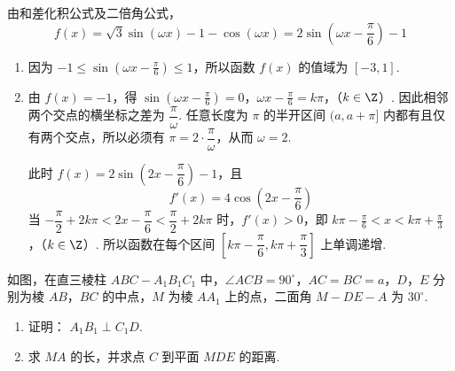 \begin{solution}
由和差化积公式及二倍角公式，
\[
f(x)=\sqrt{3}\sin(\omega x)-1-\cos(\omega x)=2\sin\left(\omega x-\frac{\pi}{6}\right)-1
\]

\begin{enumerate}
\item 因为 \(-1\leqslant\sin\left(\omega x-\frac{\pi}{6}\right)\leqslant1\)，所以函数 \(f(x)\) 的值域为 \([-3,1]\).
\item 由 \(f(x)=-1\)，得
\(\sin\left(\omega x-\frac{\pi}{6}\right)=0\)，\(\omega x-\frac{\pi}{6}=k\pi\)，（\(k\in\Z\)）.
因此相邻两个交点的横坐标之差为 \(\dfrac{\pi}{\omega}\). 任意长度为 \(\pi\) 的半开区间 \((a,a+\pi]\) 内都有且仅有两个交点，所以必须有 \(\pi=2\cdot\dfrac{\pi}{\omega}\)，从而 \(\omega=2\).

此时 \(f(x)=2\sin\left(2x-\dfrac{\pi}{6}\right)-1\)，且
\[
f'(x)=4\cos\left(2x-\frac{\pi}{6}\right)
\]
当 \(-\dfrac{\pi}{2}+2k\pi<2x-\dfrac{\pi}{6}<\dfrac{\pi}{2}+2k\pi\) 时，\(f'(x)>0\)，即
\(k\pi-\frac{\pi}{6}<x<k\pi+\frac{\pi}{3}\)，（\(k\in\Z\)）.
所以函数在每个区间 \(\left[k\pi-\dfrac{\pi}{6},k\pi+\dfrac{\pi}{3}\right]\) 上单调递增.
\end{enumerate}
\end{solution}

\begin{problem}
如图，在直三棱柱 \(ABC - A_{1}B_{1}C_{1}\) 中，\(\angle ACB = 90^{\circ}\)，\(AC = BC = a\)，\(D\)，\(E\) 分别为棱 \(AB\)，\(BC\) 的中点，\(M\) 为棱 \(AA_{1}\) 上的点，二面角 \(M - DE - A\) 为 \(30^{\circ}\).

\begin{enumerate}
\item 证明： \(A_{1}B_{1} \perp C_{1}D\).
\item 求 \(MA\) 的长，并求点 \(C\) 到平面 \(MDE\) 的距离.
\end{enumerate}

\end{problem}

